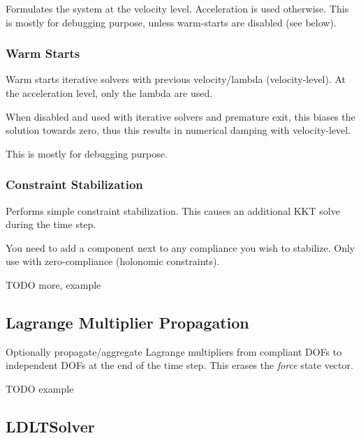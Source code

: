 
Formulates the system at the velocity level. Acceleration is used
otherwise. This is mostly for debugging purpose, unless warm-starts
are disabled (see below).

\subsubsection{Warm Starts}


Warm starts iterative solvers with previous velocity/lambda (velocity-level). At the
acceleration level, only the lambda are used.

When disabled and used with iterative solvers and premature exit, this
biases the solution towards zero, thus this results in numerical
damping with velocity-level.

This is mostly for debugging purpose.

\subsubsection{Constraint Stabilization}


Performs simple constraint stabilization. This causes an additional
KKT solve during the time step.

You need to add a  component next to any
compliance you wish to stabilize. Only use with zero-compliance
(holonomic constraints).

TODO more, example

\subsection{Lagrange Multiplier Propagation}


Optionally propagate/aggregate Lagrange multipliers from compliant
DOFs to independent DOFs at the end of the time step. This erases the
\emph{force} state vector.

TODO example

\subsection{LDLTSolver}

